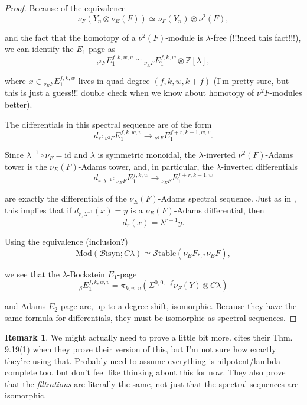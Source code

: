 \documentclass[10pt]{amsart}
\theoremstyle{definition}
\numberwithin{figure}{section}
\numberwithin{equation}{section}
\newtheorem{rem}[figure]{Remark}
\theoremstyle{cited}
\newcommand{\bZ}{\mathbb{Z}}
\newcommand{\Mod}{\mathrm{Mod}}
\newcommand{\Bisyn}{\mathcal{B}\mathrm{isyn}}
\newcommand{\Stable}{\mathcal{S}\mathrm{table}}
\begin{document}
\begin{proof}
Because of the equivalence
$$
\nu_F(Y_n\otimes\nu_E(F))\simeq\nu_F(Y_n)\otimes\nu^2(F),
$$

and the fact that the homotopy of a $\nu^2(F)$-module is $\lambda$-free (!!!need this fact!!!), we can identify the $E_1$-page as
$$
{}_{\nu^2F}E_1^{f,k,w,v}\cong {}_{\nu_EF}E_1^{f,k,w}\otimes \bZ[\lambda],
$$

where $x\in{}_{\nu_EF}E_1^{f,k,w}$ lives in quad-degree $(f,k,w,k+f)$ (I'm pretty sure, but this is just a guess!!! double check when we know about homotopy of $\nu^2F$-modules better).

The differentials in this spectral sequence are of the form
$$
d_r:{}_{\nu^2F}E_1^{f,k,w,v}\to {}_{\nu^2F}E_1^{f+r,k-1,w,v}.
$$

Since $\lambda^{-1}\circ\nu_F=\mathrm{id}$ and $\lambda$ is symmetric monoidal, the $\lambda$-inverted $\nu^2(F)$-Adams tower is the $\nu_E(F)$-Adams tower, and, in particular, the $\lambda$-inverted differentials 
$$
d_{r,\lambda^{-1}}:{}_{\nu_EF}E_1^{f,k,w}\to{}_{\nu_EF}E_1^{f+r,k-1,w}
$$

are exactly the differentials of the $\nu_E(F)$-Adams spectral sequence. Just as in \cite{BHS19}, this implies that if $d_{r,\lambda^{-1}}(x)=y$ is a $\nu_E(F)$-Adams differential, then
$$
d_r(x)=\lambda^{r-1}y.
$$

Using the equivalence (inclusion?)
$$
\Mod(\Bisyn;C\lambda)\simeq\Stable(\nu_EF_{*,*}\nu_EF),
$$

we see that the $\lambda$-Bockstein $E_1$-page
$$
{}_{\beta}E_1^{f,k,w,v}=\pi_{k,w,v}(\Sigma^{0,0,-f}\nu_F(Y)\otimes C\lambda)
$$

and Adams $E_2$-page are, up to a degree shift, isomorphic. Because they have the same formula for differentials, they must be isomorphic as spectral sequences.
\end{proof}

\begin{rem}
We might actually need to prove a little bit more. \cite{BHS19} cites their Thm. 9.19(1) when they prove their version of this, but I'm not sure how exactly they're using that. Probably need to assume everything is nilpotent/lambda complete too, but don't feel like thinking about this for now. They also prove that the \textit{filtrations} are literally the same, not just that the spectral sequences are isomorphic.
\end{rem}
\end{document}
